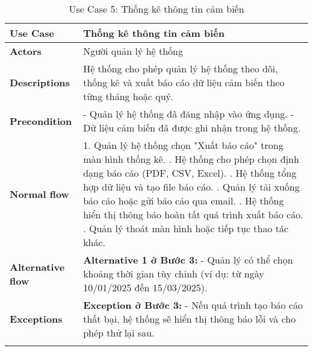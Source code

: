 \begin{longtable}{|p{}|p{}|}
    \hline
    \textbf{Use Case}         & \textbf{Thống kê thông tin cảm biến}                                                                             \\
    \hline
    \textbf{Actors}           & Người quản lý hệ thống                                                                                           \\
    \hline
    \textbf{Descriptions}     & Hệ thống cho phép quản lý hệ thống theo dõi, thống kê và xuất báo cáo dữ liệu cảm biến theo từng tháng hoặc quý. \\
    \hline
    \textbf{Precondition}     &
    - Quản lý hệ thống đã đăng nhập vào ứng dụng. \newline
    - Dữ liệu cảm biến đã được ghi nhận trong hệ thống.                                                                                          \\
    \hline
    \textbf{Normal flow}      &
    1. Quản lý hệ thống chọn "Xuất báo cáo" trong màn hình thống kê. \newline
    2. Hệ thống cho phép chọn định dạng báo cáo (PDF, CSV, Excel). \newline
    3. Hệ thống tổng hợp dữ liệu và tạo file báo cáo. \newline
    4. Quản lý tải xuống báo cáo hoặc gửi báo cáo qua email. \newline
    5. Hệ thống hiển thị thông báo hoàn tất quá trình xuất báo cáo. \newline
    6. Quản lý thoát màn hình hoặc tiếp tục thao tác khác.                                                                                       \\
    \hline
    \textbf{Alternative flow} &
    \textbf{Alternative 1 ở Bước 3:} \newline
    - Quản lý có thể chọn khoảng thời gian tùy chỉnh (ví dụ: từ ngày 10/01/2025 đến 15/03/2025).                                                 \\
    \hline
    \textbf{Exceptions}       &
    \textbf{Exception ở Bước 3:} \newline
    - Nếu quá trình tạo báo cáo thất bại, hệ thống sẽ hiển thị thông báo lỗi và cho phép thử lại sau.                                            \\
    \hline
    \caption{Use Case 5: Thống kê thông tin cảm biến}
    \label{tab:usecase5}
\end{longtable}

